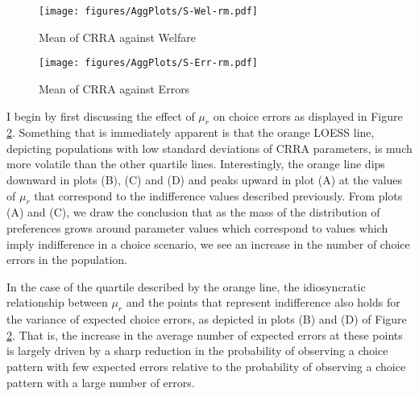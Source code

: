 \documentclass[../main.tex]{subfiles}
\begin{document}
\begin{figure}[h!]
	\center
	\caption{Mean of CRRA against Welfare}
	\texttt{[image: figures/AggPlots/S-Wel-rm.pdf]}
	\label{fig:S-Wel-rm}
\end{figure}

\begin{figure}[h!]
	\center
	\caption{Mean of CRRA against Errors}
	\texttt{[image: figures/AggPlots/S-Err-rm.pdf]}
	\label{fig:S-Err-rm}
\end{figure}


I begin by first discussing the effect of $\mu_r$ on choice errors as displayed in Figure \ref{fig:S-Err-rm}.
Something that is immediately apparent is that the orange LOESS line, depicting populations with low standard deviations of CRRA parameters, is much more volatile than the other quartile lines.
Interestingly, the orange line dips downward in plots (B), (C) and (D) and peaks upward in plot (A) at the values of $\mu_r$ that correspond to the indifference values described previously.
From plots (A) and (C), we draw the conclusion that as the mass of the distribution of preferences grows around parameter values which correspond to values which imply indifference in a choice scenario, we see an increase in the number of choice errors in the population.

In the case of the quartile described by the orange line, the idiosyncratic relationship between $\mu_r$ and the points that represent indifference also holds for the variance of expected choice errors, as depicted in plots (B) and (D) of Figure \ref{fig:S-Err-rm}.
That is, the increase in the average number of expected errors at these points is largely driven by a sharp reduction in the probability of observing a choice pattern with few expected errors relative to the probability of observing a choice pattern with a large number of errors.{\footnotemark}

\addtocounter{footnote}{-1}
\end{document}
